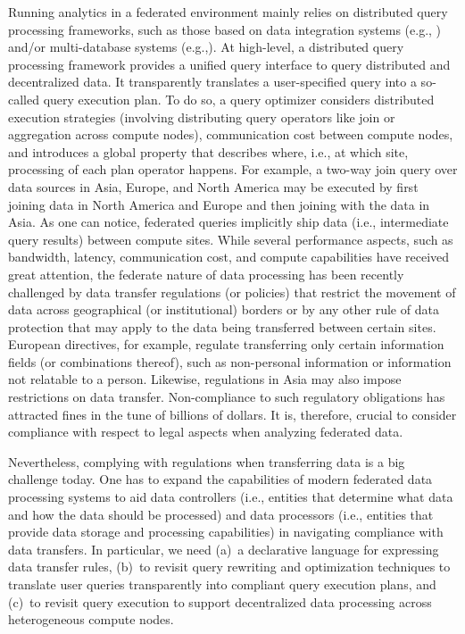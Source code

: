 \documentclass[11pt]{article}
\begin{document}
Running analytics in a federated environment mainly relies
on distributed query processing frameworks, such as those
based on data integration systems (e.g., \cite{presto})
and/or multi-database systems (e.g.,\cite{rheem,Taft2020}).
At high-level, a distributed query processing framework
provides a unified query interface to query distributed and
decentralized data. It  transparently translates a
user-specified query into a so-called query execution plan.
To do so, a query optimizer considers distributed execution
strategies (involving distributing query operators like join
or aggregation across compute nodes), communication cost
between compute nodes, and introduces a global property that
describes where, i.e., at which site, processing of each
plan operator happens. For example, a two-way join query
over data sources in Asia, Europe, and North America may be
executed by first joining data in North America and Europe
and then joining with the data in Asia.
%
As one can notice, federated queries implicitly ship data
(i.e., intermediate query results) between compute sites.
While several performance aspects, such as bandwidth,
latency, communication cost, and compute capabilities have
received great attention, the federate nature of data
processing has been recently challenged by data transfer
regulations (or policies) that restrict the movement of data
across geographical (or institutional) borders or by any
other rule of data protection that may apply to the data
being transferred between certain sites. European
directives, for example, regulate transferring only certain
information fields (or combinations thereof), such as
non-personal information or information not relatable to a
person. Likewise, regulations in Asia may also impose
restrictions on data transfer. Non-compliance to such
regulatory obligations has attracted fines in the tune of
billions of dollars\cite{cms-gdpr-fines}. It is, therefore,
crucial to consider compliance with respect to legal aspects
when analyzing federated data.


Nevertheless, complying with regulations when transferring
data is a big challenge today. One has to expand the
capabilities of modern federated data processing systems to
aid data controllers (i.e., entities that determine what
data and how the data should be processed) and data
processors (i.e., entities that provide data storage and
processing capabilities) in navigating compliance with data
transfers. In particular, we need (a)~a declarative language
for expressing data transfer rules, (b)~to revisit query
rewriting and optimization techniques to translate user
queries transparently into compliant query execution plans,
and (c)~to revisit query execution to support decentralized
data processing across heterogeneous compute nodes.
\end{document}
